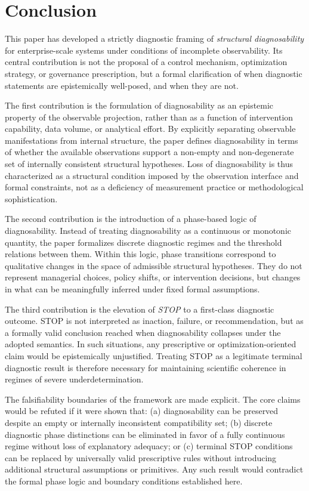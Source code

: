 ﻿\section{Conclusion}
\label{sec:conclusion}

This paper has developed a strictly diagnostic framing of
\emph{structural diagnosability} for enterprise-scale systems under conditions
of incomplete observability.
Its central contribution is not the proposal of a control mechanism,
optimization strategy, or governance prescription, but a formal clarification
of when diagnostic statements are epistemically well-posed, and when they are
not.

The first contribution is the formulation of diagnosability as an epistemic
property of the observable projection, rather than as a function of
intervention capability, data volume, or analytical effort.
By explicitly separating observable manifestations from internal structure,
the paper defines diagnosability in terms of whether the available observations
support a non-empty and non-degenerate set of internally consistent structural
hypotheses.
Loss of diagnosability is thus characterized as a structural condition imposed
by the observation interface and formal constraints, not as a deficiency of
measurement practice or methodological sophistication.

The second contribution is the introduction of a phase-based logic of
diagnosability.
Instead of treating diagnosability as a continuous or monotonic quantity, the
paper formalizes discrete diagnostic regimes and the threshold relations
between them.
Within this logic, phase transitions correspond to qualitative changes in the
space of admissible structural hypotheses.
They do not represent managerial choices, policy shifts, or intervention
decisions, but changes in what can be meaningfully inferred under fixed formal
assumptions.

The third contribution is the elevation of \emph{STOP} to a first-class
diagnostic outcome.
STOP is not interpreted as inaction, failure, or recommendation, but as a
formally valid conclusion reached when diagnosability collapses under the
adopted semantics.
In such situations, any prescriptive or optimization-oriented claim would be
epistemically unjustified.
Treating STOP as a legitimate terminal diagnostic result is therefore necessary
for maintaining scientific coherence in regimes of severe underdetermination.

The falsifiability boundaries of the framework are made explicit.
The core claims would be refuted if it were shown that:
(a) diagnosability can be preserved despite an empty or internally inconsistent
compatibility set;
(b) discrete diagnostic phase distinctions can be eliminated in favor of a
fully continuous regime without loss of explanatory adequacy; or
(c) terminal STOP conditions can be replaced by universally valid prescriptive
rules without introducing additional structural assumptions or primitives.
Any such result would contradict the formal phase logic and boundary conditions
established here.


